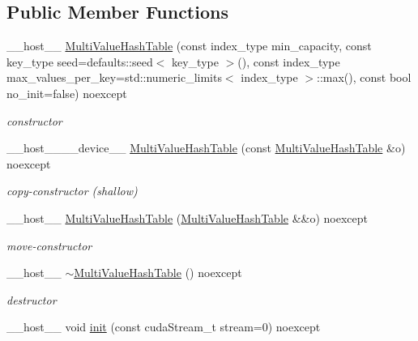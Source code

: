 \subsection*{Public Member Functions}
\begin{DoxyCompactItemize}
\item 
\+\_\+\+\_\+host\+\_\+\+\_\+ \hyperlink{classwarpcore_1_1MultiValueHashTable_acbcf649a55f735827a3729bdcd5493d1}{Multi\+Value\+Hash\+Table} (const index\+\_\+type min\+\_\+capacity, const key\+\_\+type seed=defaults\+::seed$<$ key\+\_\+type $>$(), const index\+\_\+type max\+\_\+values\+\_\+per\+\_\+key=std\+::numeric\+\_\+limits$<$ index\+\_\+type $>$\+::max(), const bool no\+\_\+init=false) noexcept
\begin{DoxyCompactList}\small\item\em constructor \end{DoxyCompactList}\item 
\+\_\+\+\_\+host\+\_\+\+\_\+\+\_\+\+\_\+device\+\_\+\+\_\+ \hyperlink{classwarpcore_1_1MultiValueHashTable_a0e399e8aff5576a3335198aca77fc9cf}{Multi\+Value\+Hash\+Table} (const \hyperlink{classwarpcore_1_1MultiValueHashTable}{Multi\+Value\+Hash\+Table} \&o) noexcept
\begin{DoxyCompactList}\small\item\em copy-\/constructor (shallow) \end{DoxyCompactList}\item 
\+\_\+\+\_\+host\+\_\+\+\_\+ \hyperlink{classwarpcore_1_1MultiValueHashTable_a2e3259d6c57e29f5b78fd722f7325ba6}{Multi\+Value\+Hash\+Table} (\hyperlink{classwarpcore_1_1MultiValueHashTable}{Multi\+Value\+Hash\+Table} \&\&o) noexcept
\begin{DoxyCompactList}\small\item\em move-\/constructor \end{DoxyCompactList}\item 
\mbox{\label{classwarpcore_1_1MultiValueHashTable_a751346c742ae71f8ee60ee8a63ecdabb}} 
\+\_\+\+\_\+host\+\_\+\+\_\+ \hyperlink{classwarpcore_1_1MultiValueHashTable_a751346c742ae71f8ee60ee8a63ecdabb}{$\sim$\+Multi\+Value\+Hash\+Table} () noexcept
\begin{DoxyCompactList}\small\item\em destructor \end{DoxyCompactList}\item 
\+\_\+\+\_\+host\+\_\+\+\_\+ void \hyperlink{classwarpcore_1_1MultiValueHashTable_ac12fa1b729821808ce4627c49bbc4d25}{init} (const cuda\+Stream\+\_\+t stream=0) noexcept

\end{DoxyCompactItemize}
